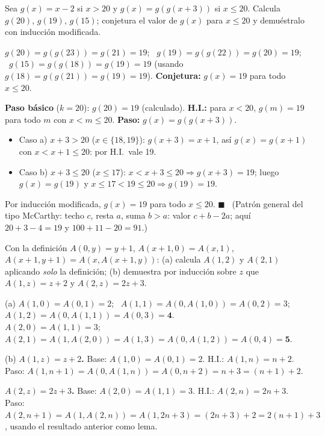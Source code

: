 \begin{prob}[\simil]
Sea $g(x)=x-2$ si $x>20$ y $g(x)=g(g(x+3))$ si $x\le20$. Calcula $g(20)$, $g(19)$, $g(15)$; conjetura el valor de $g(x)$ para $x\le20$ y demuéstralo con inducción modificada.
\end{prob}
\begin{sol}
$g(20)=g(g(23))=g(21)=19$; \ $g(19)=g(g(22))=g(20)=19$; \ $g(15)=g(g(18))=g(19)=19$ (usando $g(18)=g(g(21))=g(19)=19$).
\textbf{Conjetura:} $g(x)=19$ para todo $x\le20$.

\textbf{Paso básico} ($k=20$): $g(20)=19$ (calculado).
\textbf{H.I.:} para $x<20$, $g(m)=19$ para todo $m$ con $x<m\le20$.
\textbf{Paso:} $g(x)=g(g(x+3))$.
\begin{itemize}
\item Caso a) $x+3>20$ ($x\in\{18,19\}$): $g(x+3)=x+1$, así $g(x)=g(x+1)$ con $x<x+1\le20$: por H.I.\ vale 19.
\item Caso b) $x+3\le20$ ($x\le17$): $x<x+3\le20\Rightarrow g(x+3)=19$; luego $g(x)=g(19)$ y $x\le17<19\le20\Rightarrow g(19)=19$.
\end{itemize}
Por inducción modificada, $g(x)=19$ para todo $x\le20$. $\blacksquare$ \ (Patrón general del tipo McCarthy: techo $c$, resta $a$, suma $b>a$: valor $c+b-2a$; aquí $20+3-4=19$ y $100+11-20=91$.)
\end{sol}

\begin{prob}
Con la definición $A(0,y)=y+1$, $A(x+1,0)=A(x,1)$, $A(x+1,y+1)=A(x,A(x+1,y))$:
(a) calcula $A(1,2)$ y $A(2,1)$ aplicando \emph{solo} la definición;
(b) demuestra por inducción sobre $z$ que $A(1,z)=z+2$ y $A(2,z)=2z+3$.
\end{prob}
\begin{sol}
(a) $A(1,0)=A(0,1)=2$; \ $A(1,1)=A(0,A(1,0))=A(0,2)=3$; \ $A(1,2)=A(0,A(1,1))=A(0,3)=\mathbf 4$.\\
$A(2,0)=A(1,1)=3$; \ $A(2,1)=A(1,A(2,0))=A(1,3)=A(0,A(1,2))=A(0,4)=\mathbf 5$.

(b) \textbf{$A(1,z)=z+2$.} Base: $A(1,0)=A(0,1)=2$. H.I.: $A(1,n)=n+2$. Paso:
$A(1,n+1)=A(0,A(1,n))=A(0,n+2)=n+3=(n+1)+2$. \checkmark

\textbf{$A(2,z)=2z+3$.} Base: $A(2,0)=A(1,1)=3$. H.I.: $A(2,n)=2n+3$. Paso:
$A(2,n+1)=A(1,A(2,n))=A(1,2n+3)=(2n+3)+2=2(n+1)+3$, usando el resultado anterior como lema. \checkmark
\end{sol}

